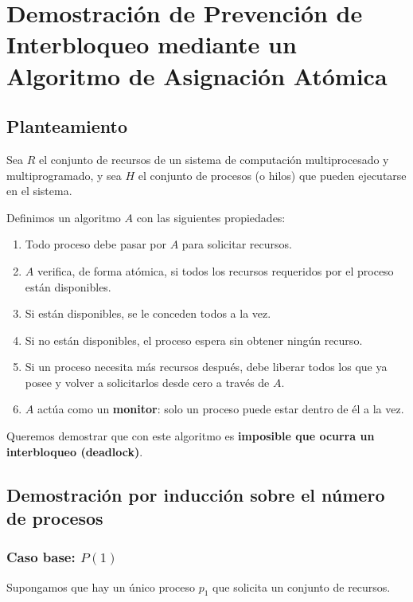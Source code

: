 \section{Demostración de Prevención de Interbloqueo mediante un Algoritmo de Asignación Atómica}
\subsection{Planteamiento}

Sea \( R \) el conjunto de recursos de un sistema de computación multiprocesado y multiprogramado, y sea \( H \) el conjunto de procesos (o hilos) que pueden ejecutarse en el sistema.

Definimos un algoritmo \( A \) con las siguientes propiedades:

\begin{enumerate}
    \item Todo proceso debe pasar por \( A \) para solicitar recursos.
    \item \( A \) verifica, de forma atómica, si todos los recursos requeridos por el proceso están disponibles.
    \item Si están disponibles, se le conceden todos a la vez.
    \item Si no están disponibles, el proceso espera sin obtener ningún recurso.
    \item Si un proceso necesita más recursos después, debe liberar todos los que ya posee y volver a solicitarlos desde cero a través de \( A \).
    \item \( A \) actúa como un \textbf{monitor}: solo un proceso puede estar dentro de él a la vez.
\end{enumerate}

\bigskip

Queremos demostrar que con este algoritmo es \textbf{imposible que ocurra un interbloqueo (deadlock)}.

\subsection{Demostración por inducción sobre el número de procesos}

\subsubsection{Caso base: \( P(1) \)}

Supongamos que hay un único proceso \( p_1 \) que solicita un conjunto de recursos.

